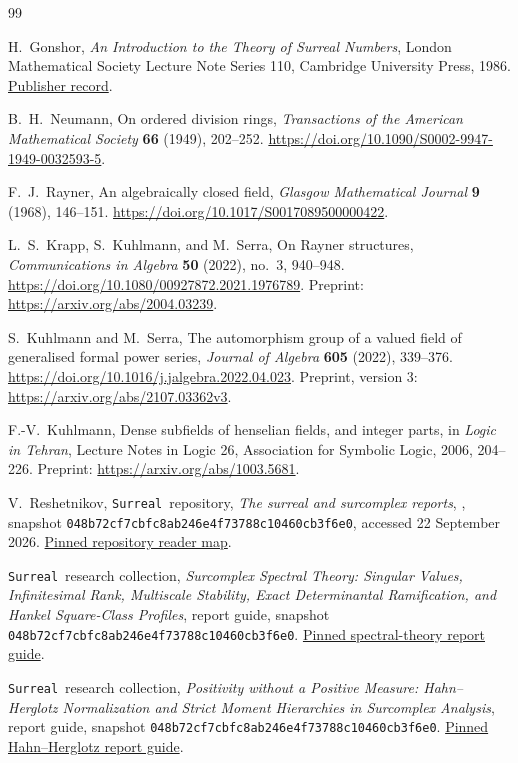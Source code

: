 \documentclass[11pt,oneside]{article}
\theoremstyle{definition}
\theoremstyle{remark}
\newcommand{\repoName}{\texttt{Surreal}}
\newcommand{\pin}{\texttt{048b72cf7cbfc8ab246e4f73788c10460cb3f6e0}}
\begin{document}
\begin{thebibliography}{99}
\small\raggedright

H.~Gonshor,
\emph{An Introduction to the Theory of Surreal Numbers},
London Mathematical Society Lecture Note Series 110,
Cambridge University Press, 1986.
\href{https://www.cambridge.org/core/books/an-introduction-to-the-theory-of-surreal-numbers/312AE504A3E88E804054BFB390446374}{Publisher record}.

B.~H.~Neumann,
On ordered division rings,
\emph{Transactions of the American Mathematical Society}
\textbf{66} (1949), 202--252.
\url{https://doi.org/10.1090/S0002-9947-1949-0032593-5}.

F.~J.~Rayner,
An algebraically closed field,
\emph{Glasgow Mathematical Journal} \textbf{9} (1968), 146--151.
\url{https://doi.org/10.1017/S0017089500000422}.

L.~S.~Krapp, S.~Kuhlmann, and M.~Serra,
On Rayner structures,
\emph{Communications in Algebra} \textbf{50} (2022), no.~3, 940--948.
\url{https://doi.org/10.1080/00927872.2021.1976789}.
Preprint: \url{https://arxiv.org/abs/2004.03239}.

S.~Kuhlmann and M.~Serra,
The automorphism group of a valued field of generalised formal power
series,
\emph{Journal of Algebra} \textbf{605} (2022), 339--376.
\url{https://doi.org/10.1016/j.jalgebra.2022.04.023}.
Preprint, version 3: \url{https://arxiv.org/abs/2107.03362v3}.

F.-V.~Kuhlmann,
Dense subfields of henselian fields, and integer parts,
in \emph{Logic in Tehran}, Lecture Notes in Logic 26,
Association for Symbolic Logic, 2006, 204--226.
Preprint: \url{https://arxiv.org/abs/1003.5681}.

V.~Reshetnikov, \repoName\ repository,
\emph{The surreal and surcomplex reports},
, snapshot \pin,
accessed 22 September 2026.
\href{https://github.com/VladimirReshetnikov/Surreal/blob/048b72cf7cbfc8ab246e4f73788c10460cb3f6e0/docs/README.md}{Pinned repository reader map}.

\repoName\ research collection,
\emph{Surcomplex Spectral Theory: Singular Values, Infinitesimal Rank,
Multiscale Stability, Exact Determinantal Ramification, and Hankel
Square-Class Profiles}, report guide, snapshot \pin.
\href{https://github.com/VladimirReshetnikov/Surreal/blob/048b72cf7cbfc8ab246e4f73788c10460cb3f6e0/docs/surcomplex/spectral-theory/README.md}{Pinned spectral-theory report guide}.

\repoName\ research collection,
\emph{Positivity without a Positive Measure: Hahn--Herglotz
Normalization and Strict Moment Hierarchies in Surcomplex Analysis},
report guide, snapshot \pin.
\href{https://github.com/VladimirReshetnikov/Surreal/blob/048b72cf7cbfc8ab246e4f73788c10460cb3f6e0/docs/surcomplex/hahn-herglotz-positivity/README.md}{Pinned Hahn--Herglotz report guide}.

\end{thebibliography}
\end{document}
